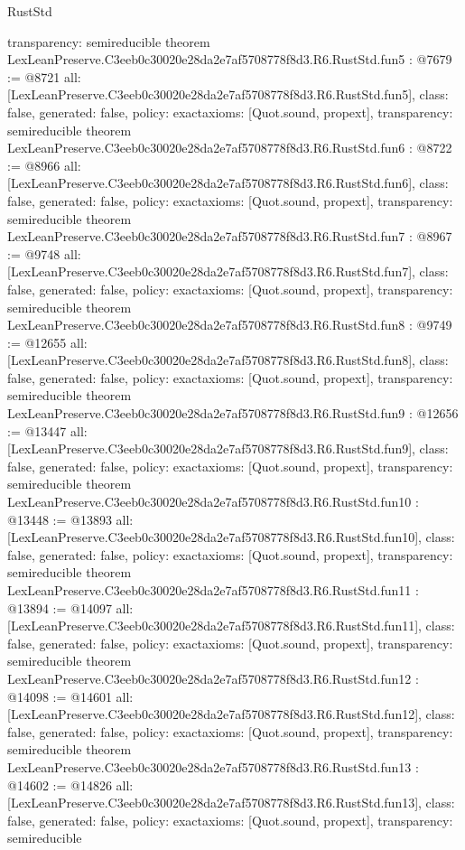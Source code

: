 \begin{lexlean}{RustStd}
\begin{coremodule}
{  transparency: semireducible
}
theorem LexLeanPreserve.C3eeb0c30020e28da2e7af5708778f8d3.R6.RustStd.fun5 : @7679 := @8721 {
  all: [LexLeanPreserve.C3eeb0c30020e28da2e7af5708778f8d3.R6.RustStd.fun5],
  class: false,
  generated: false,
  policy: exact{axioms: [Quot.sound, propext]},
  transparency: semireducible
}
theorem LexLeanPreserve.C3eeb0c30020e28da2e7af5708778f8d3.R6.RustStd.fun6 : @8722 := @8966 {
  all: [LexLeanPreserve.C3eeb0c30020e28da2e7af5708778f8d3.R6.RustStd.fun6],
  class: false,
  generated: false,
  policy: exact{axioms: [Quot.sound, propext]},
  transparency: semireducible
}
theorem LexLeanPreserve.C3eeb0c30020e28da2e7af5708778f8d3.R6.RustStd.fun7 : @8967 := @9748 {
  all: [LexLeanPreserve.C3eeb0c30020e28da2e7af5708778f8d3.R6.RustStd.fun7],
  class: false,
  generated: false,
  policy: exact{axioms: [Quot.sound, propext]},
  transparency: semireducible
}
theorem LexLeanPreserve.C3eeb0c30020e28da2e7af5708778f8d3.R6.RustStd.fun8 : @9749 := @12655 {
  all: [LexLeanPreserve.C3eeb0c30020e28da2e7af5708778f8d3.R6.RustStd.fun8],
  class: false,
  generated: false,
  policy: exact{axioms: [Quot.sound, propext]},
  transparency: semireducible
}
theorem LexLeanPreserve.C3eeb0c30020e28da2e7af5708778f8d3.R6.RustStd.fun9 : @12656 := @13447 {
  all: [LexLeanPreserve.C3eeb0c30020e28da2e7af5708778f8d3.R6.RustStd.fun9],
  class: false,
  generated: false,
  policy: exact{axioms: [Quot.sound, propext]},
  transparency: semireducible
}
theorem LexLeanPreserve.C3eeb0c30020e28da2e7af5708778f8d3.R6.RustStd.fun10 : @13448 := @13893 {
  all: [LexLeanPreserve.C3eeb0c30020e28da2e7af5708778f8d3.R6.RustStd.fun10],
  class: false,
  generated: false,
  policy: exact{axioms: [Quot.sound, propext]},
  transparency: semireducible
}
theorem LexLeanPreserve.C3eeb0c30020e28da2e7af5708778f8d3.R6.RustStd.fun11 : @13894 := @14097 {
  all: [LexLeanPreserve.C3eeb0c30020e28da2e7af5708778f8d3.R6.RustStd.fun11],
  class: false,
  generated: false,
  policy: exact{axioms: [Quot.sound, propext]},
  transparency: semireducible
}
theorem LexLeanPreserve.C3eeb0c30020e28da2e7af5708778f8d3.R6.RustStd.fun12 : @14098 := @14601 {
  all: [LexLeanPreserve.C3eeb0c30020e28da2e7af5708778f8d3.R6.RustStd.fun12],
  class: false,
  generated: false,
  policy: exact{axioms: [Quot.sound, propext]},
  transparency: semireducible
}
theorem LexLeanPreserve.C3eeb0c30020e28da2e7af5708778f8d3.R6.RustStd.fun13 : @14602 := @14826 {
  all: [LexLeanPreserve.C3eeb0c30020e28da2e7af5708778f8d3.R6.RustStd.fun13],
  class: false,
  generated: false,
  policy: exact{axioms: [Quot.sound, propext]},
  transparency: semireducible
}
\end{coremodule}
\end{lexlean}
